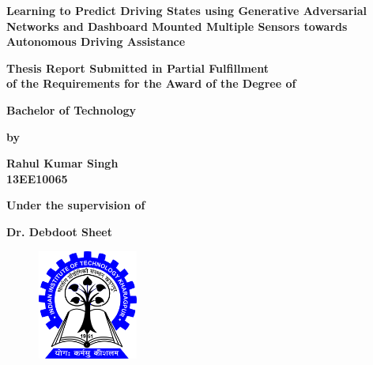 \documentclass[a4paper,11pt,titlepage,drop]{article}%
\begin{document}


\thispagestyle{empty}

\begin{center}
    \Huge\bfseries
    Learning to Predict Driving States using Generative Adversarial Networks and Dashboard Mounted Multiple Sensors towards Autonomous Driving Assistance
\end{center}

\vfill \vfill \vfill \vfill

\begin{center}
    \bfseries
    Thesis Report Submitted in Partial Fulfillment \\ of the Requirements for the Award of the Degree of 
\end{center}

\vfill

\begin{center}
    \Large\bfseries
    Bachelor of Technology
\end{center}

\vfill

\begin{center}
    \bfseries
    by
\end{center}

\vfill

\begin{center}
    \Large\bfseries
    Rahul Kumar Singh \\
     \large\bfseries 
     13EE10065 \\
\end{center}

\vfill

\begin{center}
    \bfseries
    Under the supervision of
\end{center}

\vfill

\begin{center}
    \Large\bfseries
    Dr. Debdoot Sheet \\
     \large\bfseries 
\end{center}

\vfill \vfill \vfill \vfill

\begin{figure}[h]
\centering
\includegraphics[width=1.31in,height=1.42in]{kgp}
\end{figure}
\end{document}
